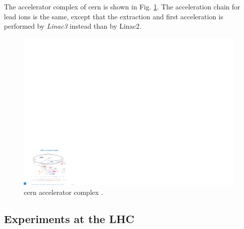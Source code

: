 The accelerator complex of \gls{cern} is shown in Fig. \ref{fig:lhc:acc}. The acceleration chain for lead ions is the same, except that the extraction and first acceleration is performed by \textit{Linac3} instead than by Linac2.

\begin{figure}[ht]
\centering
\includegraphics[width=1\textwidth]{figures/lhc/acc_complex.pdf}
\caption{\gls{cern} accelerator complex \cite{Christiane:1260465}.}
\label{fig:lhc:acc}
\end{figure}

\subsection{Experiments at the LHC}

